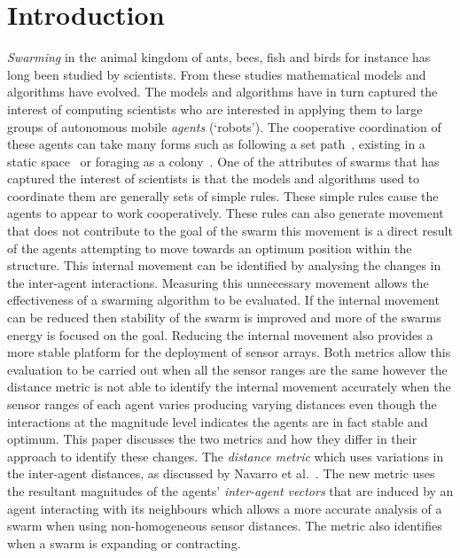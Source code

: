 \documentclass{ieeeaccess}
\begin{document}
\section{Introduction\label{sec:intro}}

\emph{Swarming} in the animal kingdom of ants, bees, fish and birds for instance has long been studied by scientists. From these studies mathematical models and algorithms have evolved. The models and algorithms have in turn captured the interest of computing scientists who are interested in applying them to large groups of autonomous mobile \emph{agents} (`robots'). The cooperative coordination of these agents can take many forms such as following a set path~\cite{HCS:09}, existing in a static space~\cite{EP:10, GP:02, GP:04} or foraging as a colony~\cite{HER:11, GK:07}. One of the attributes of swarms that has captured the interest of scientists is that the models and algorithms used to coordinate them are generally sets of simple rules. These simple rules cause the agents to appear to work cooperatively. These rules can also generate movement that does not contribute to the goal of the swarm this movement is a direct result of the agents attempting to move towards an optimum position within the structure. This internal movement can be identified by analysing the changes in the inter-agent interactions. Measuring this unnecessary movement allows the effectiveness of a swarming algorithm to be evaluated. If the internal movement can be reduced then stability of the swarm is improved and more of the swarms energy is focused on the goal. Reducing the internal movement also provides a more stable platform for the deployment of sensor arrays. Both metrics allow this evaluation to be carried out when all the sensor ranges are the same however the distance metric is not able to identify the internal movement accurately when the sensor ranges of each agent varies producing varying distances even though the interactions at the magnitude level indicates the agents are in fact stable and optimum. This paper discusses the two metrics and how they differ in their approach to identify these changes. The \emph{distance metric} which uses variations in the inter-agent distances, as discussed by Navarro et al.~\cite{NIM:09}. The new metric uses the resultant magnitudes of the agents' \emph{inter-agent vectors} that are induced by an agent interacting with its neighbours which allows a more accurate analysis of a swarm when using non-homogeneous sensor distances. The metric also identifies when a swarm is expanding or contracting. 
\end{document}
